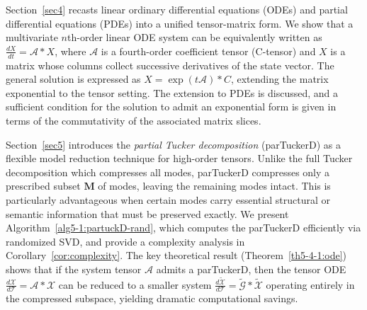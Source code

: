 \documentclass[11pt, oneside]{article}  %
\newcommand{\A}{\mathcal{A}}
\newcommand{\tG}{\tilde{\mathcal{G}}}
\newcommand{\caM}{\mathbf{M}}
\newcommand{\T}{\mathcal{T}}
\newcommand{\X}{\mathcal{X}}
\newcommand{\ttX}{\tilde{\X}}
\begin{document}
Section~\ref{sec4} recasts linear ordinary differential equations (ODEs) and partial differential equations (PDEs) into a unified tensor-matrix form.  We show that a multivariate $n$th-order linear ODE system can be equivalently written as $\frac{dX}{dt} = \A\ast X$, where $\A$ is a fourth-order coefficient tensor (C-tensor) and $X$ is a matrix whose columns collect successive derivatives of the state vector.  The general solution is expressed as $X = \exp(t\A)\ast C$, extending the matrix exponential to the tensor setting.  The extension to PDEs is discussed, and a sufficient condition for the solution to admit an exponential form is given in terms of the commutativity of the associated matrix slices.

Section~\ref{sec5} introduces the \emph{partial Tucker decomposition} (parTuckerD) as a flexible model reduction technique for high-order tensors.  Unlike the full Tucker decomposition which compresses all modes, parTuckerD compresses only a prescribed subset $\caM$ of modes, leaving the remaining modes intact.  This is particularly advantageous when certain modes carry essential structural or semantic information that must be preserved exactly.  We present Algorithm~\ref{alg5-1:partuckD-rand}, which computes the parTuckerD efficiently via randomized SVD, and provide a complexity analysis in Corollary~\ref{cor:complexity}.  The key theoretical result (Theorem~\ref{th5-4-1:ode}) shows that if the system tensor $\A$ admits a parTuckerD, then the tensor ODE $\frac{d\X}{d\T} = \A\ast \X$ can be reduced to a smaller system $\frac{d\ttX}{d\T} = \tG\ast \ttX$ operating entirely in the compressed subspace, yielding dramatic computational savings.
\end{document}
